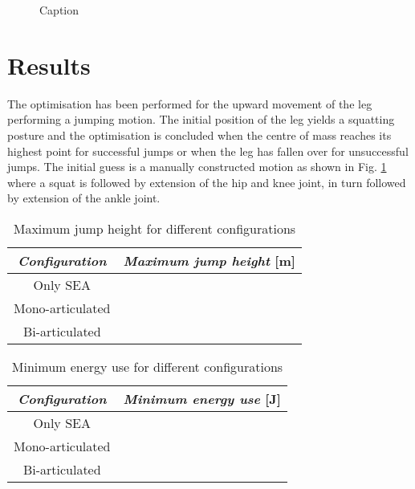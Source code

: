 \documentclass[letterpaper, 10 pt, conference]{ieeeconf}  %
\begin{document}
	





   \begin{figure}[thpb]
      \centering
      \caption{Caption}
      \label{fig:seq}
   \end{figure}
   
\section{Results} \label{sec:results}

The optimisation has been performed for the upward movement of the leg performing a jumping motion. The initial position of the leg yields a squatting posture and the optimisation is concluded when the centre of mass reaches its highest point for successful jumps or when the leg has fallen over for unsuccessful jumps. The initial guess is a manually constructed motion as shown in Fig. \ref{fig:seq} where a squat is followed by extension of the hip and knee joint, in turn followed by extension of the ankle joint.   
\begin{table}[h]
	\caption{Maximum jump height for different configurations}
	\label{maxheight}
	\begin{center}
		\begin{tabular}{c||c}
		\textit{Configuration}	& \textit{Maximum jump height} [m] \\
			\hline
			Only SEA &   \\
			\hline
			Mono-articulated &  \\
			\hline
			Bi-articulated & 
		\end{tabular}
	\end{center}
\end{table}

\begin{table}[h]
	\caption{Minimum energy use for different configurations}
	\label{maxheight}
	\begin{center}
		\begin{tabular}{c||c}
			\textit{Configuration}	& \textit{Minimum energy use} [J] \\
			\hline
			Only SEA &   \\
			\hline
			Mono-articulated &  \\
			\hline
			Bi-articulated & 
		\end{tabular}
	\end{center}
\end{table}
\end{document}
